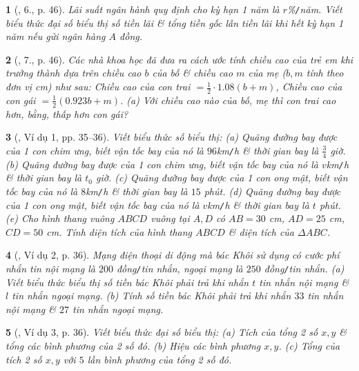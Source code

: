 \documentclass{article}
\newtheorem{baitoan}{}
\begin{document}
\begin{baitoan}[\cite{SGK_Toan_7_Canh_Dieu_tap_2}, 6., p. 46]
	Lãi suất ngân hành quy định cho kỳ hạn 1 năm là $r$\%\emph{\texttt{/}}năm. Viết biểu thức đại số biểu thị số tiền lãi \& tổng tiền gốc lẫn tiền lãi khi hết kỳ hạn 1 năm nếu gửi ngân hàng $A$ đồng.
\end{baitoan}

\begin{baitoan}[\cite{SGK_Toan_7_Canh_Dieu_tap_2}, 7., p. 46]
	Các nhà khoa học đã đưa ra cách ước tính chiều cao của trẻ em khi trưởng thành dựa trên chiều cao $b$ của bố \& chiều cao $m$ của mẹ ($b,m$ tính theo đơn vị cm) như sau: Chiều cao của con trai $= \frac{1}{2}\cdot1.08(b + m)$, Chiều cao của con gái $= \frac{1}{2}(0.923b + m)$. (a) Với chiều cao nào của bố, mẹ thì con trai cao hơn, bằng, thấp hơn con gái?
\end{baitoan}

\begin{baitoan}[\cite{SBT_Toan_7_Canh_Dieu_tap_2}, Ví dụ 1, pp. 35--36]
	Viết biểu thức số biểu thị: (a) Quãng đường bay được của 1 con chim ưng, biết vận tốc bay của nó là $96$\emph{km\texttt{/}h} \& thời gian bay là $\frac{3}{4}$ giờ. (b) Quãng đường bay được của 1 con chim ưng, biết vận tốc bay của nó là $v$\emph{km\texttt{/}h} \& thời gian bay là $t_0$ giờ. (c) Quãng đường bay được của 1 con ong mật, biết vận tốc bay của nó là $8$\emph{km\texttt{/}h} \& thời gian bay là $15$ phút. (d) Quãng đường bay được của 1 con ong mật, biết vận tốc bay của nó là $v$\emph{km\texttt{/}h} \& thời gian bay là $t$ phút. (e) Cho hình thang vuông $ABCD$ vuông tại $A,D$ có $AB = 30$ \emph{cm}, $AD = 25$ \emph{cm}, $CD = 50$ \emph{cm}. Tính diện tích của hình thang $ABCD$ \& diện tích của $\Delta ABC$.
\end{baitoan}

\begin{baitoan}[\cite{SBT_Toan_7_Canh_Dieu_tap_2}, Ví dụ 2, p. 36]
	Mạng điện thoại di động mà bác Khôi sử dụng có cước phí nhắn tin nội mạng là $200$ đồng\emph{\texttt{/}}tin nhắn, ngoại mạng là $250$ đồng\emph{\texttt{/}}tin nhắn. (a) Viết biểu thức biểu thị số tiền bác Khôi phải trả khi nhắn $t$ tin nhắn nội mạng \& $l$ tin nhắn ngoại mạng. (b) Tính số tiền bác Khôi phải trả khi nhắn $33$ tin nhắn nội mạng \& $27$ tin nhắn ngoại mạng.
\end{baitoan}

\begin{baitoan}[\cite{SBT_Toan_7_Canh_Dieu_tap_2}, Ví dụ 3, p. 36]
	Viết biểu thức đại số biểu thị: (a) Tích của tổng 2 số $x,y$ \& tổng các bình phương của 2 số đó. (b) Hiệu các bình phương $x,y$. (c) Tổng của tích 2 số $x,y$ với $5$ lần bình phương của tổng 2 số đó.
\end{baitoan}
\end{document}
